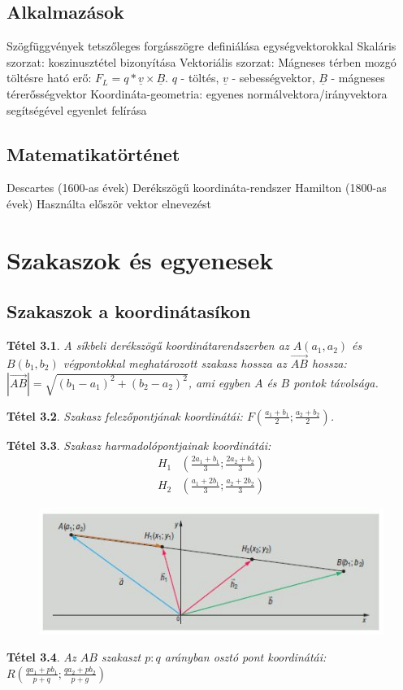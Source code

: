 \documentclass[twoside,12pt]{report}
\renewcommand{\vec}{\underline}
\newtheorem{theorem}{Tétel}[section]
\theoremstyle{definition}
\begin{document}
\section{Alkalmazások}
	\begin{outline}
		\1 Szögfüggvények tetszőleges forgásszögre definiálása egységvektorokkal
		\1 Skaláris szorzat: koszinusztétel bizonyítása
		\1 Vektoriális szorzat: Mágneses térben mozgó töltésre ható erő: $F_L=q*\vec{v}\times\vec{B}$. $q$ - töltés, $\vec{v}$ - sebességvektor, $\vec{B}$ - mágneses térerősségvektor
		\1 Koordináta-geometria: egyenes normálvektora/irányvektora segítségével egyenlet felírása
	\end{outline}
\section{Matematikatörténet}
	\begin{outline}
		\1 Descartes (1600-as évek)
			\2 Derékszögű koordináta-rendszer
		\1 Hamilton (1800-as évek)
			\2 Használta először vektor elnevezést
	\end{outline}
\chapter{Szakaszok és egyenesek}
\section{Szakaszok a koordinátasíkon}
	\begin{theorem}
		A síkbeli derékszögű koordinátarendszerben az $A(a_1,a_2)$ és $B(b_1,b_2)$ végpontokkal meghatározott szakasz hossza az $\overrightarrow{AB}$ hossza: $|\overrightarrow{AB}|=\sqrt{(b_1-a_1)^2+(b_2-a_2)^2}$, ami egyben $A$ és $B$ pontok távolsága.
	\end{theorem}
	\begin{theorem}
		Szakasz felezőpontjának koordinátái: $F\left(\frac{a_1+b_1}{2};\frac{a_2+b_2}{2}\right)$.
	\end{theorem}
	\begin{theorem}
		Szakasz harmadolópontjainak koordinátái:
		\begin{align*}
			H_1&\left(\frac{2a_1+b_1}{3};\frac{2a_2+b_2}{3}\right)\\
			H_2&\left(\frac{a_1+2b_1}{3};\frac{a_2+2b_2}{3}\right)
		\end{align*}
		\begin{figure}[H]
			\centering
			\includegraphics[width=0.8\linewidth]{Harmad}
		\end{figure}
	\end{theorem}
	\begin{theorem}
		Az $AB$ szakaszt $p:q$ arányban osztó pont koordinátái: $R\left(\frac{qa_1+pb_1}{p+q};\frac{qa_2+pb_2}{p+g}\right)$
	\end{theorem}
\end{document}
